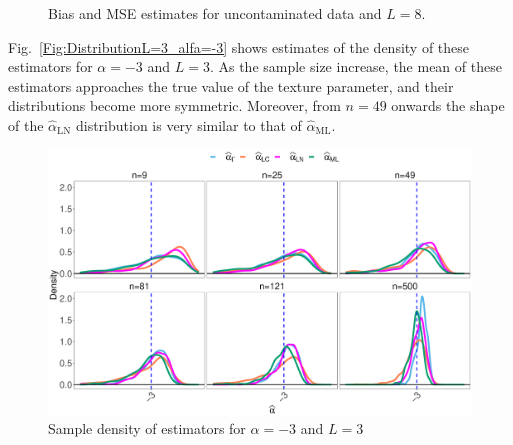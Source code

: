 \documentclass[twocolumn]{svjour3}
\begin{document}
\begin{figure}[hbt]
	\centering
	\caption{Bias and MSE estimates for uncontaminated data and $L=8$.}\label{SesgoyECMSinContL=8} 
\end{figure}


Fig.~\ref{Fig:DistributionL=3_alfa=-3} shows estimates of the density of these estimators for $\alpha=-3$ and $L=3$. 
As the sample size increase, the mean of these estimators approaches the true value of the texture parameter, and their distributions become more symmetric. 
Moreover, from $n=49$ onwards the shape of the $\widehat{\alpha}_{\text{{LN}}}$ distribution is very similar to that of $\widehat{\alpha}_{\text{{ML}}}$.

\begin{figure}[hbt]
	\centering
	\includegraphics[width=1\linewidth]{../../../Figures/PaperTesis/DensidadEstimadorNoCont.eps}
	\caption{\label{Fig:DistributionL=3_alfa=-3} Sample density of estimators for $\alpha=-3$ and  $L=3$ }\label{Fig:DistEstimator}
\end{figure}
\end{document}
